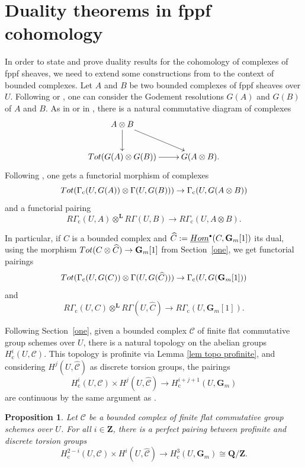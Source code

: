 \documentclass[10pt,a4paper]{amsart}
\let\mathcal\mathscr
\newcommand{\sbullet}{{\scriptscriptstyle\bullet}}
\newcommand{\rc}{\mathrm{c}}
\theoremstyle{plain}
\newtheorem{prop}[theo]{Proposition}
\theoremstyle{definition}
\newcommand \ZZ {\mathbf{Z}}
\newcommand \QQ {\mathbf{Q}}
\newcommand \LL {\mathbf{L}}
\newcommand \Gm {\mathbf{G}_m}\let\G\Gm
\newcommand \cC {\mathcal{C}}
\begin{document}
\section{Duality theorems in fppf cohomology} \label{two}

In order to state and prove duality results for the cohomology of complexes of fppf sheaves, we need to extend some constructions from \cite{DemH} to the context of bounded complexes.
Let $A$ and $B$ be two bounded complexes of fppf sheaves over $U$. Following \cite[XVII,\,4.2.9]{SGA4} or \cite[App.\,A]{friedsus}, one can consider the Godement resolutions $G(A)$ and $G(B)$ of $A$ and $B$. As in \cite[II.6.6]{God} or in \cite[App.\,A]{friedsus}, there is a natural commutative diagram of complexes
\[
\xymatrix{
A \otimes B \ar[rd] \ar[d] & \\
\textup{Tot}(G(A) \otimes G(B)) \ar[r] & G(A \otimes B).
}
\]
Following \cite[Proof of Lem.\,4.1]{DemH}, one gets a functorial morphism of complexes
\begin{equation} \label{cup complexes}
\textup{Tot}(\Gamma_\rc(U, G(A)) \otimes \Gamma(U,G(B))) \to \Gamma_\rc(U,G(A \otimes B))
\end{equation}
and a functorial pairing
\[
R\Gamma_\rc(U,A) \otimes^{\LL} R\Gamma(U,B) \to R\Gamma_\rc(U,A \otimes B).
\]

In particular, if $C$ is a bounded complex and $\widehat{C}:= \underline{\textup{Hom}}^\sbullet(C, \Gm[1])$ its dual, using the morphism $\textup{Tot}(C \otimes \widehat{C}) \to \Gm[1]$ from Section~\ref{one}, we get functorial pairings
\[\textup{Tot}(\Gamma_\rc(U, G(C)) \otimes \Gamma(U,G(\widehat{C}))) \to \Gamma_\rc(U,G(\Gm[1]))
\]
and
\begin{equation} \label{pairing derived}
R\Gamma_\rc(U,C) \otimes^{\LL} R\Gamma(U,\widehat{C}) \to R\Gamma_\rc(U,\Gm[1]).
\end{equation}

Following Section~\ref{one}, given a bounded complex $\cC$ of finite flat commutative group schemes over $U$, there is a natural topology on the abelian groups $H^i_\rc(U, \cC)$. This topology is profinite via Lemma \ref{lem topo profinite}, and considering $H^j(U, \widehat{\cC})$ as discrete torsion groups, the pairings
\[
H^i_\rc(U, \cC) \times H^j(U, \widehat{\cC}) \to H^{i+j+1}_\rc(U, \G)
\]
are continuous by the same argument as \cite[Lem.\,4.4]{DemH}.

\begin{prop} \label{AMM complex}
Let $\cC$ be a bounded complex of finite flat commutative group schemes over $U$.
For all $i \in \ZZ$, there is a perfect pairing between profinite and discrete torsion groups\vspace*{-3pt}
\[
H^{2-i}_\rc(U, \cC) \times H^i(U, \widehat{\cC}) \to H^3_\rc(U,\G) \cong \QQ/\ZZ.
\]
\end{prop}
\end{document}
